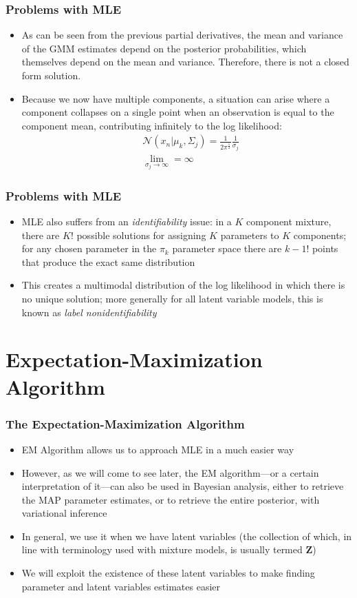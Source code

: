 \documentclass{beamer}
\begin{document}
\begin{frame}
\frametitle{Problems with MLE}
\begin{itemize}
	\item As can be seen from the previous partial derivatives, the mean and variance of the GMM estimates depend on the posterior probabilities, which themselves depend on the mean and variance. Therefore, there is not a closed form solution.
	\item Because we now have multiple components, a situation can arise where a component collapses on a single point when an observation is equal to the component mean, contributing infinitely to the log likelihood:
	\begin{align*}
	&\mathcal{N}(x_n|\mu_k, \Sigma_j) = \frac{1}{2\pi^{\frac{1}{2}}}\frac{1}{\sigma_j}\\ 
	&\lim_{\sigma_j \to \infty} = \infty
	\end{align*}
\end{itemize}

\end{frame}

\begin{frame}
\frametitle{Problems with MLE}
	\begin{itemize}
		\item MLE also suffers from an \textit{identifiability} issue: in a $K$ component mixture, there are $K!$ possible solutions for assigning $K$ parameters to $K$ components; for any chosen parameter in the $\pi_k$ parameter space there are $k-1!$ points that produce the exact same distribution
		\item This creates a multimodal distribution of the log likelihood in which there is no unique solution; more generally for all latent variable models, this is known as \textit{label nonidentifiability}
	\end{itemize}
\end{frame}

\section{Expectation-Maximization Algorithm}

\begin{frame}
\frametitle{The Expectation-Maximization Algorithm}
	\begin{itemize}
		\item EM Algorithm allows us to approach MLE in a much easier way
		\item However, as we will come to see later, the EM algorithm---or a certain interpretation of it---can also be used in Bayesian analysis, either to retrieve the MAP parameter estimates, or to retrieve the entire posterior, with variational inference
		\item In general, we use it when we have latent variables (the collection of which, in line with terminology used with mixture models, is usually termed $\mathbf{Z}$)
		\item We will exploit the existence of these latent variables to make finding parameter and latent variables estimates easier
	\end{itemize}
\end{frame}
\end{document}
